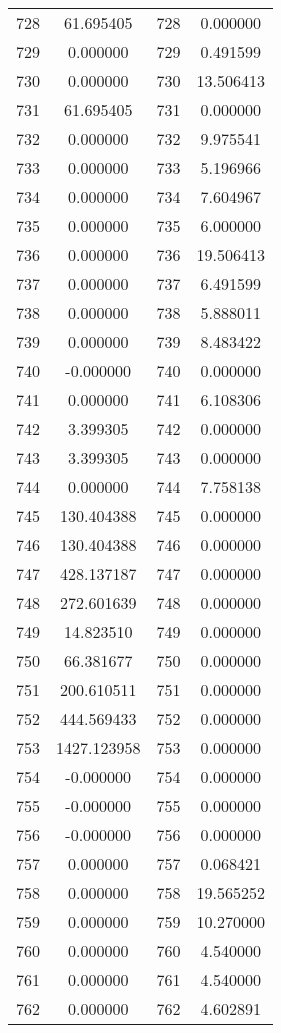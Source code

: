 \documentclass[12pt]{article}
\begin{document}
\begin{longtable}{@{}cccc@{}}
728 & 61.695405 & 728 & 0.000000 \\
729 & 0.000000 & 729 & 0.491599 \\
730 & 0.000000 & 730 & 13.506413 \\
731 & 61.695405 & 731 & 0.000000 \\
732 & 0.000000 & 732 & 9.975541 \\
733 & 0.000000 & 733 & 5.196966 \\
734 & 0.000000 & 734 & 7.604967 \\
735 & 0.000000 & 735 & 6.000000 \\
736 & 0.000000 & 736 & 19.506413 \\
737 & 0.000000 & 737 & 6.491599 \\
738 & 0.000000 & 738 & 5.888011 \\
739 & 0.000000 & 739 & 8.483422 \\
740 & -0.000000 & 740 & 0.000000 \\
741 & 0.000000 & 741 & 6.108306 \\
742 & 3.399305 & 742 & 0.000000 \\
743 & 3.399305 & 743 & 0.000000 \\
744 & 0.000000 & 744 & 7.758138 \\
745 & 130.404388 & 745 & 0.000000 \\
746 & 130.404388 & 746 & 0.000000 \\
747 & 428.137187 & 747 & 0.000000 \\
748 & 272.601639 & 748 & 0.000000 \\
749 & 14.823510 & 749 & 0.000000 \\
750 & 66.381677 & 750 & 0.000000 \\
751 & 200.610511 & 751 & 0.000000 \\
752 & 444.569433 & 752 & 0.000000 \\
753 & 1427.123958 & 753 & 0.000000 \\
754 & -0.000000 & 754 & 0.000000 \\
755 & -0.000000 & 755 & 0.000000 \\
756 & -0.000000 & 756 & 0.000000 \\
757 & 0.000000 & 757 & 0.068421 \\
758 & 0.000000 & 758 & 19.565252 \\
759 & 0.000000 & 759 & 10.270000 \\
760 & 0.000000 & 760 & 4.540000 \\
761 & 0.000000 & 761 & 4.540000 \\
762 & 0.000000 & 762 & 4.602891 \\

\end{longtable}
\end{document}
